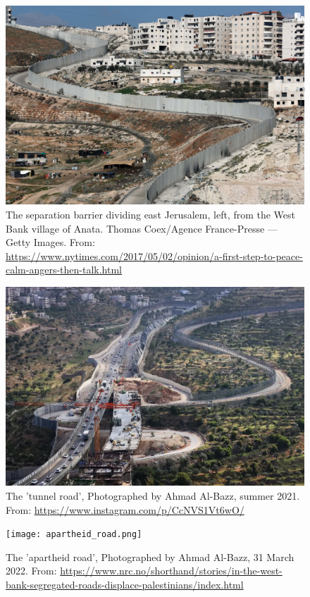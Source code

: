 \documentclass[dissertation,math,vertlayout,pdfa,colorlinks]{aaltoseries}
\begin{document}
\begin{figure}
    \centering
    \includegraphics[width=1\linewidth]{separation-barrier-nyimes.jpg}
    \caption{The separation barrier dividing east Jerusalem, left, from the West Bank village of Anata. Thomas Coex/Agence France-Presse — Getty Images. From: \url{https://www.nytimes.com/2017/05/02/opinion/a-first-step-to-peace-calm-angers-then-talk.html}}
    \label{fig:separation-barrier}
\end{figure}

\begin{figure}
    \centering
    \includegraphics[width=1\linewidth]{gilo_bridge.jpg}
    \caption{The 'tunnel road', Photographed by Ahmad Al-Bazz, summer 2021. From: \url{https://www.instagram.com/p/CcNVS1Vt6wO/}}
    \label{fig:tunnel_road}
\end{figure}

\begin{figure}
    \centering
    \texttt{[image: apartheid\_road.png]}
    \caption{The 'apartheid road', Photographed by Ahmad Al-Bazz, 31 March 2022. From: \url{https://www.nrc.no/shorthand/stories/in-the-west-bank-segregated-roads-displace-palestinians/index.html}}
    \label{fig:apartheid-road}
\end{figure}
\end{document}
